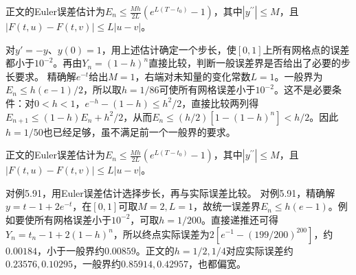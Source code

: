 正文的Euler误差估计为\(E_n\le\frac{Mh}{2L}(e^{L(T-t_0)}-1)\)，其中\(|y^{\prime\prime}|\le M\)，且\(|F(t,u)-F(t,v)|\le L|u-v|\)。

对\(y'=-y\)、\(y(0)=1\)，用上述估计确定一个步长，使\([0,1]\)上所有网格点的误差都小于\(10^{-2}\)。再由\(Y_n=(1-h)^n\)直接比较，判断一般误差界是否给出了必要的步长要求。
\solutionanswer
精确解\(e^{-t}\)给出\(M=1\)，右端对未知量的变化常数\(L=1\)。一般界为\(E_n\le h(e-1)/2\)，所以取\(h=1/86\)可使所有网格误差小于\(10^{-2}\)。这不是必要条件：对\(0<h<1\)，\(e^{-h}-(1-h)\le h^2/2\)，直接比较两列得\(E_{n+1}\le(1-h)E_n+h^2/2\)，从而\(E_n\le(h/2)[1-(1-h)^n]<h/2\)。因此\(h=1/50\)也已经足够，虽不满足前一个一般界的要求。


正文的Euler误差估计为\(E_n\le\frac{Mh}{2L}(e^{L(T-t_0)}-1)\)，其中\(|y^{\prime\prime}|\le M\)，且\(|F(t,u)-F(t,v)|\le L|u-v|\)。

对例5.91，用Euler误差估计选择步长，再与实际误差比较。
\solutionanswer
对例5.91，精确解\(y=t-1+2e^{-t}\)，在\([0,1]\)可取\(M=2,L=1\)，故统一误差界\(E_n\le h(e-1)\)。例如要使所有网格误差小于\(10^{-2}\)，可取\(h=1/200\)。直接递推还可得\(Y_n=t_n-1+2(1-h)^n\)，所以终点实际误差为\(2[e^{-1}-(199/200)^{200}]\)，约\(0.00184\)，小于一般界约\(0.00859\)。正文的\(h=1/2,1/4\)对应实际误差约\(0.23576,0.10295\)，一般界约\(0.85914,0.42957\)，也都偏宽。
\par
